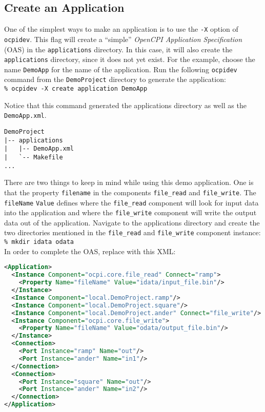 \subsection{Create an Application}
One of the simplest ways to make an application is to use the \verb+-X+ option of \verb+ocpidev+. This flag will create a ``simple'' \textit{OpenCPI Application Specification} (OAS) in the \verb+applications+ directory. In this case, it will also create the \verb+applications+ directory, since it does not yet exist. For the example, choose the name \verb+DemoApp+ for the name of the application. Run the following \verb+ocpidev+ command from the \verb+DemoProject+ directory to generate the application:\\

\forceindent\verb+% ocpidev -X create application DemoApp+\\
\OcpidevCreate{}

Notice that this command generated the applications directory as well as the \verb+DemoApp.xml+.

\begin{verbatim}
DemoProject
|-- applications
|   |-- DemoApp.xml
|   `-- Makefile
...
\end{verbatim}

There are two things to keep in mind while using this demo application. One is that the property \verb+filename+ in the components \verb+file_read+ and \verb+file_write+. The \verb+fileName+ \verb+Value+ defines where the \verb+file_read+ component will look for input data into the application and where the \verb+file_write+ component will write the output data out of the application. \newline
\bstart
Navigate to the applications directory and create the two directories mentioned in the \verb+file_read+ and \verb+file_write+ component instance:\\

\forceindent\verb+% mkdir idata odata+\\
\bend
\bstart
\label{example:application}
In order to complete the OAS, replace  with this XML:
\begin{lstlisting}[language=xml]
<Application>
  <Instance Component="ocpi.core.file_read" Connect="ramp">
    <Property Name="fileName" Value="idata/input_file.bin"/>
  </Instance>
  <Instance Component="local.DemoProject.ramp"/>
  <Instance Component="local.DemoProject.square"/>
  <Instance Component="local.DemoProject.ander" Connect="file_write"/>
  <Instance Component="ocpi.core.file_write">
    <Property Name="fileName" Value="odata/output_file.bin"/>
  </Instance>
  <Connection>
    <Port Instance="ramp" Name="out"/>
    <Port Instance="ander" Name="in1"/>
  </Connection>
  <Connection>
    <Port Instance="square" Name="out"/>
    <Port Instance="ander" Name="in2"/>
  </Connection>
</Application>
\end{lstlisting}
\bend

